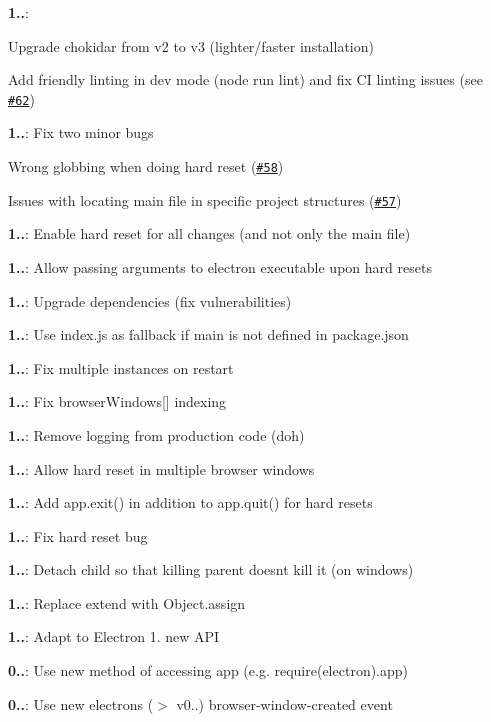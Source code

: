 \begin{DoxyItemize}
\item {\bfseries 1..}\+:
\begin{DoxyItemize}
\item Upgrade {\ttfamily chokidar} from v2 to v3 (lighter/faster installation)
\item Add friendly linting in dev mode ({\ttfamily node run lint}) and fix CI linting issues (see \href{https://github.com/yan-foto/electron-reload/pull/62}{\tt \#62})
\end{DoxyItemize}
\item {\bfseries 1..}\+: Fix two minor bugs
\begin{DoxyItemize}
\item Wrong globbing when doing hard reset (\href{https://github.com/yan-foto/electron-reload/issues/58}{\tt {\ttfamily \#58}})
\item Issues with locating main file in specific project structures (\href{https://github.com/yan-foto/electron-reload/issues/57}{\tt {\ttfamily \#57}})
\end{DoxyItemize}
\item {\bfseries 1..}\+: Enable hard reset for all changes (and not only the main file)
\item {\bfseries 1..}\+: Allow passing arguments to electron executable upon hard resets
\item {\bfseries 1..}\+: Upgrade dependencies (fix vulnerabilities)
\item {\bfseries 1..}\+: Use {\ttfamily index.\+js} as fallback if {\ttfamily main} is not defined in {\ttfamily package.\+json}
\item {\bfseries 1..}\+: Fix multiple instances on restart
\item {\bfseries 1..}\+: Fix {\ttfamily browser\+Windows\mbox{[}\mbox{]}} indexing
\item {\bfseries 1..}\+: Remove logging from production code (d\textquotesingle{}oh)
\item {\bfseries 1..}\+: Allow hard reset in multiple browser windows
\item {\bfseries 1..}\+: Add {\ttfamily app.\+exit()} in addition to {\ttfamily app.\+quit()} for hard resets
\item {\bfseries 1..}\+: Fix hard reset bug
\item {\bfseries 1..}\+: Detach child so that killing parent doesn\textquotesingle{}t kill it (on windows)
\item {\bfseries 1..}\+: Replace {\ttfamily extend} with {\ttfamily Object.\+assign}
\item {\bfseries 1..}\+: Adapt to Electron 1. new A\+PI
\item {\bfseries 0..}\+: Use new method of accessing {\ttfamily app} (e.\+g. {\ttfamily require(electron).app})
\item {\bfseries 0..}\+: Use new electrons ($>$ v0..) {\ttfamily browser-\/window-\/created} event 
\end{DoxyItemize}